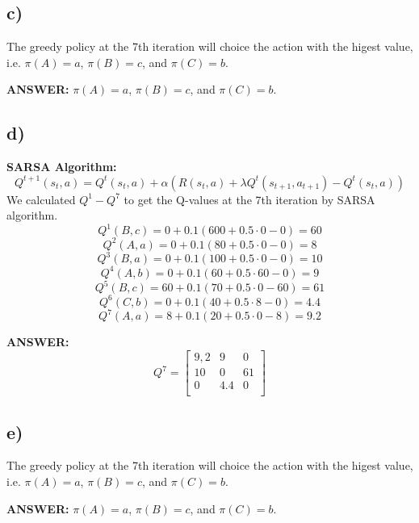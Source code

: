 \documentclass{article}
\begin{document}
\subsection*{c)}
The greedy policy at the 7th iteration will choice the action with the higest value, i.e. $\pi(A)=a$, $\pi(B)=c$, and $\pi(C)=b$.

\textbf{ANSWER:} $\pi(A)=a$, $\pi(B)=c$, and $\pi(C)=b$.

\subsection*{d)}
\textbf{SARSA Algorithm:} \begin{equation}
 Q^{t+1}(s_t,a) = Q^t(s_t,a) + \alpha \left(R(s_t,a) + \lambda Q^t(s_{t+1}, a_{t+1}) - Q^t(s_t,a) \right)\end{equation}
We calculated $Q^1-Q^7$ to get the Q-values at the 7th iteration by SARSA algorithm. 
\begin{equation*}
     Q^{1}(B,c) = 0 + 0.1(600 + 0.5\cdot0 - 0 ) = 60
\end{equation*}
\begin{equation*}
     Q^{2}(A,a) = 0 + 0.1(80 + 0.5\cdot0 - 0 ) = 8
\end{equation*}
\begin{equation*}
     Q^{3}(B,a) = 0 + 0.1(100 + 0.5\cdot0 - 0 ) = 10
\end{equation*}
\begin{equation*}
     Q^{4}(A,b) = 0 + 0.1(60 + 0.5\cdot60 - 0 ) = 9
\end{equation*}
\begin{equation*}
     Q^{5}(B,c) = 60 + 0.1(70 + 0.5\cdot0 - 60 ) = 61
\end{equation*}
\begin{equation*}
     Q^{6}(C,b) = 0 + 0.1(40 + 0.5\cdot8 - 0 ) = 4.4
\end{equation*}
\begin{equation*}
     Q^{7}(A,a) = 8 + 0.1(20 + 0.5\cdot0 -8 ) = 9.2
\end{equation*}

\textbf{ANSWER:}
\begin{equation*}
    Q^7=
    \left[
    \begin{array}{ccc}
        9,2 & 9 & 0 \\
         10 & 0 & 61 \\
         0 & 4.4 & 0 \\
    \end{array}
    \right]
\end{equation*}

\subsection*{e)}
The greedy policy at the 7th iteration will choice the action with the higest value, i.e. $\pi(A)=a$, $\pi(B)=c$, and $\pi(C)=b$.

\textbf{ANSWER:} $\pi(A)=a$, $\pi(B)=c$, and $\pi(C)=b$.
\end{document}
